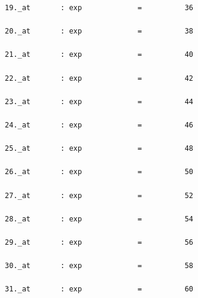 \documentclass[
]{book}
\begin{document}
\begin{verbatim}
19._at       : exp             =          36

20._at       : exp             =          38

21._at       : exp             =          40

22._at       : exp             =          42

23._at       : exp             =          44

24._at       : exp             =          46

25._at       : exp             =          48

26._at       : exp             =          50

27._at       : exp             =          52

28._at       : exp             =          54

29._at       : exp             =          56

30._at       : exp             =          58

31._at       : exp             =          60


\end{verbatim}
\end{document}
